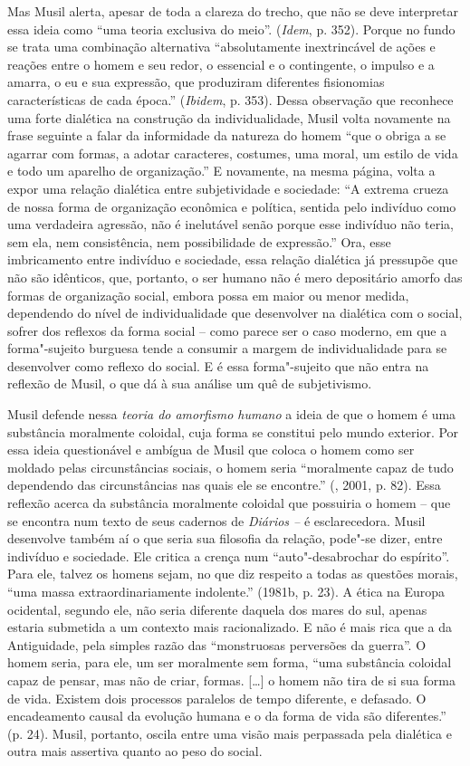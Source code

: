 Mas Musil alerta, apesar de toda a clareza do trecho, que não se deve
interpretar essa ideia como ``uma teoria exclusiva do meio''.
(\emph{Idem}, p. 352). Porque no fundo se trata uma combinação
alternativa ``absolutamente inextrincável de ações e reações entre o
homem e seu redor, o essencial e o contingente, o impulso e a amarra, o
eu e sua expressão, que produziram diferentes fisionomias
características de cada época.'' (\emph{Ibidem}, p. 353). Dessa observação
que reconhece uma forte dialética na construção da individualidade,
Musil volta novamente na frase seguinte a falar da informidade da
natureza do homem ``que o obriga a se agarrar com formas, a adotar
caracteres, costumes, uma moral, um estilo de vida e todo um aparelho de
organização.'' E novamente, na mesma página, volta a expor uma relação
dialética entre subjetividade e sociedade: ``A extrema crueza de nossa
forma de organização econômica e política, sentida pelo indivíduo como
uma verdadeira agressão, não é inelutável senão porque esse indivíduo
não teria, sem ela, nem consistência, nem possibilidade de expressão.''
Ora, esse imbricamento entre indivíduo e sociedade, essa relação
dialética já pressupõe que não são idênticos, que, portanto, o ser
humano não é mero depositário amorfo das formas de organização social,
embora possa em maior ou menor medida, dependendo do nível de
individualidade que desenvolver na dialética com o social, sofrer dos
reflexos da forma social -- como parece ser o caso moderno, em que a
forma"-sujeito burguesa tende a consumir a margem de individualidade para
se desenvolver como reflexo do social. E é essa forma"-sujeito que não
entra na reflexão de Musil, o que dá à sua análise um quê de
subjetivismo.

Musil defende nessa \emph{teoria do amorfismo humano} a ideia de que o
homem é uma substância moralmente coloidal, cuja forma se constitui pelo
mundo exterior. Por essa ideia questionável e ambígua de Musil que
coloca o homem como ser moldado pelas circunstâncias sociais, o homem
seria ``moralmente capaz de tudo dependendo das circunstâncias nas quais
ele se encontre.'' (, 2001, p. 82). Essa reflexão acerca da
substância moralmente coloidal que possuiria o homem -- que se encontra
num texto de seus cadernos de \emph{Diários --} é esclarecedora. Musil
desenvolve também aí o que seria sua filosofia da relação, pode"-se
dizer, entre indivíduo e sociedade. Ele critica a crença num
``auto"-desabrochar do espírito''. Para ele, talvez os homens sejam, no
que diz respeito a todas as questões morais, ``uma massa
extraordinariamente indolente.'' (1981b, p. 23). A ética na Europa
ocidental, segundo ele, não seria diferente daquela dos mares do sul,
apenas estaria submetida a um contexto mais racionalizado. E não é mais
rica que a da Antiguidade, pela simples razão das ``monstruosas
perversões da guerra''. O homem seria, para ele, um ser moralmente sem
forma, ``uma substância coloidal capaz de pensar, mas não de criar,
formas. [\ldots{}] o homem não tira de si sua forma de vida. Existem
dois processos paralelos de tempo diferente, e defasado. O encadeamento
causal da evolução humana e o da forma de vida são diferentes.'' (p.
24). Musil, portanto, oscila entre uma visão mais perpassada pela
dialética e outra mais assertiva quanto ao peso do social.

